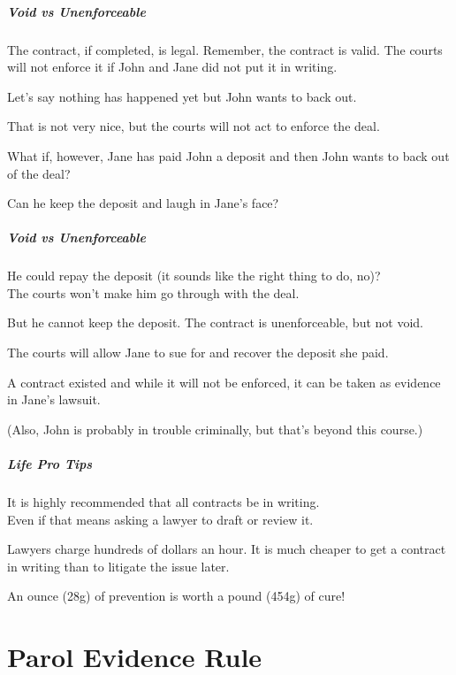 \begin{frame}
\frametitle{Void vs Unenforceable}

The contract, if completed, is legal. Remember, the contract is valid. The courts will not enforce it if John and Jane did not put it in writing.

Let's say nothing has happened yet but John wants to back out. 

That is not very nice, but the courts will not act to enforce the deal.

What if, however, Jane has paid John a deposit and then John wants to back out of the deal?

Can he keep the deposit and laugh in Jane's face?

\end{frame}



\begin{frame}
\frametitle{Void vs Unenforceable}

He could repay the deposit (it sounds like the right thing to do, no)?\\
\quad The courts won't make him go through with the deal.

But he cannot keep the deposit. The contract is unenforceable, but not void. 

The courts will allow Jane to sue for and recover the deposit she paid.

A contract existed and while it will not be enforced, it can be taken as evidence in Jane's lawsuit.

(Also, John is probably in trouble criminally, but that's beyond this course.)

\end{frame}



\begin{frame}
\frametitle{Life Pro Tips}

It is highly recommended that all contracts be in writing.\\
\quad Even if that means asking a lawyer to draft or review it.

Lawyers charge hundreds of dollars an hour. It is much cheaper to get a contract in writing than to litigate the issue later.

An ounce (28g) of prevention is worth a pound (454g) of cure!

\end{frame}


\part{Parol Evidence Rule}

